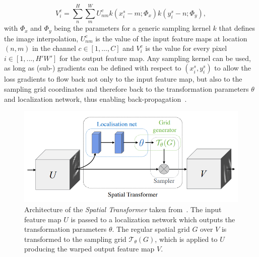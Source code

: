 \begin{equation}
	V_i^c = \sum^{H}_{n} \sum^{W}_{m} U_{nm}^c k(x_i^s - m; \Phi_x) k(y_i^s - n; \Phi_y),
\end{equation}
with $\Phi_x$ and $\Phi_y$ being the parameters for a generic sampling  kernel $k$ that defines the image interpolation, $U_{nm}^c$ is the value of the input feature maps at location $(n,m)$ in the channel $c \in [1, ..., C]$ and $V_i^c$ is the value for every pixel $i \in [1, ..., H'W']$ for the output feature map. Any sampling kernel can be used, as long as (sub-) gradients can be defined with respect to $(x_i^s, y_i^s)$ to allow the loss gradients to flow back not only to the input feature map, but also to the sampling grid coordinates and therefore back to the transformation parameters $\theta$ and localization network, thus enabling back-propagation~\cite{SpatialTransformer}.

\begin{figure}[h] %
	\centering
	\graphicspath{{images/}{\main/images/}}
	\includegraphics[width=\linewidth]{SpatialTransformer.png} 
	\caption{Architecture of the \emph{Spatial Transformer} taken from~\cite{SpatialTransformer}. The input feature map $U$ is passed to a localization network which outputs the transformation parameters $\theta$. The regular spatial grid $G$ over $V$ is transformed to the sampling grid $\mathcal{T}_\theta(G)$, which is applied to $U$ producing the warped output feature map $V$.}
	\label{fig:SpatialTransformer}
\end{figure}


